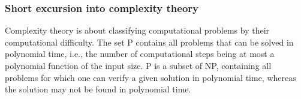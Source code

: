 \subsubsection{Short excursion into complexity theory}
\begin{center}
\end{center}

Complexity theory is about classifying computational problems by their computational difficulty. The set P contains all problems that can be solved in polynomial time, i.e., the number of computational steps being at most a polynomial function of the input size. P is a subset of NP, containing all problems for which one can verify a given solution in polynomial time, whereas the solution may not be found in polynomial time.

